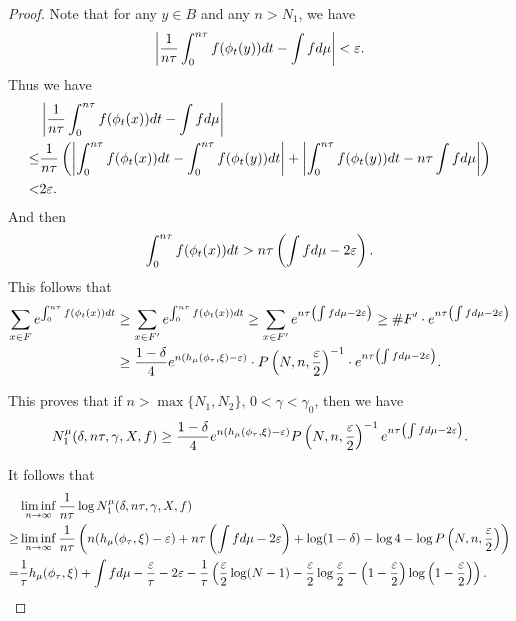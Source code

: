 \documentclass[10pt,a4paper]{amsart}
\begin{document}
\begin{proof}
Note that for any \( y \in B \) and any \( n > N_1 \), we have
\[
\left| \frac{1}{n\tau} \int_0^{n\tau} f(\phi_t(y)) {\rm d}t - \int f {\rm d}\mu \right| < \varepsilon.
\]
Thus we have
\[
\begin{aligned}
&\left| \frac{1}{n\tau} \int_0^{n\tau} f(\phi_t(x)) {\rm d}t - \int f {\rm d}\mu \right| \\
\leq& \frac{1}{n\tau} \left( \left| \int_0^{n\tau} f(\phi_t(x)) {\rm d}t - \int_0^{n\tau} f(\phi_t(y)) {\rm d}t \right| + \left| \int_0^{n\tau} f(\phi_t(y)) {\rm d}t-  n\tau\int f {\rm d}\mu \right| \right)\\
<& 2\varepsilon.
\end{aligned}
\]
And then
\[
\int_0^{n\tau} f(\phi_t(x)) {\rm d}t> n\tau \left( \int f {\rm d}\mu - 2\varepsilon \right).
\]
This follows that
\[
\begin{aligned}
\sum_{x \in F} e^{\int_0^{n\tau} f(\phi_t(x)) {\rm d}t} &\geq \sum_{x \in F'} e^{\int_0^{n\tau} f(\phi_t(x)) {\rm d}t} \geq \sum_{x \in F'} e^{n\tau \left( \int f {\rm d}\mu - 2\varepsilon \right)} \geq \# F' \cdot e^{n\tau \left( \int f {\rm d}\mu - 2\varepsilon \right)} \\
&\geq \frac{1 - \delta}{4} e^{n(h_\mu(\phi_\tau, \xi) - \varepsilon)} \cdot P\left( N, n, \frac{\varepsilon}{2} \right)^{-1} \cdot e^{n\tau \left( \int f {\rm d}\mu - 2\varepsilon \right)}.
\end{aligned}
\]

This proves that if \( n > \max\{N_1, N_2\}, \,0<\gamma<\gamma_0 \), then we have
\[
N_1^\mu(\delta, n\tau, \gamma, X, f) \geq \frac{1 - \delta}{4} e^{n(h_\mu(\phi_\tau, \xi) - \varepsilon)} P\left( N, n, \frac{\varepsilon}{2} \right)^{-1} e^{n\tau \left( \int f {\rm d}\mu - 2\varepsilon \right)}.
\]

\noindent
It follows that
\[
\begin{aligned}
&\liminf_{n \to \infty} \frac{1}{n\tau} \log N_1^\mu(\delta, n\tau, \gamma, X, f) \\
\geq& \liminf_{n \to \infty} \frac{1}{n\tau} \left( n(h_\mu(\phi_\tau, \xi) - \varepsilon) + n\tau \left( \int f {\rm d}\mu -2\varepsilon \right)+\log(1 - \delta) - \log 4 - \log P\left( N, n, \frac{\varepsilon}{2} \right) \right) \\
=& \frac{1}{\tau} h_\mu(\phi_\tau, \xi) + \int f {\rm d}\mu - \frac{\varepsilon}{\tau} - 2\varepsilon -\frac{1}{\tau} \left(\frac{\varepsilon}{2} \log(N - 1) - \frac{\varepsilon}{2} \log \frac{\varepsilon}{2} - \left( 1 - \frac{\varepsilon}{2} \right) \log \left( 1 - \frac{\varepsilon}{2} \right)\right).
\end{aligned}
\]


\end{proof}
\end{document}

